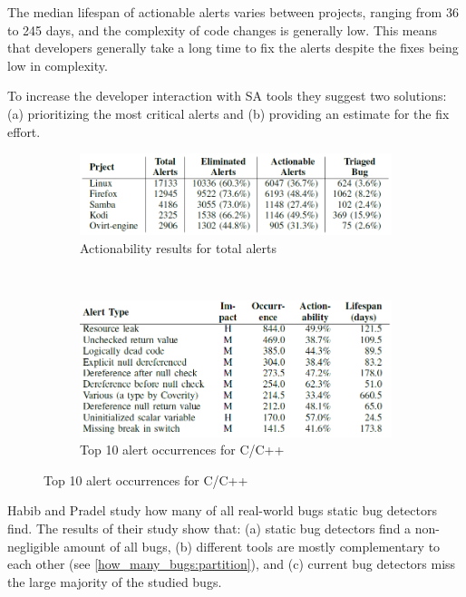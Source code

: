  The median lifespan of actionable alerts varies between projects, ranging from 36 to 245 days, and the complexity of code changes is generally low. This means that developers generally take a long time to fix the alerts despite the fixes being low in complexity.

 To increase the developer interaction with SA tools they suggest two solutions: (a) prioritizing the most critical alerts and (b) providing an estimate for the fix effort.

 \begin{figure}[H]
     \begin{subfigure}{1\textwidth}
         \centering
         \includegraphics[scale=0.4]{./src/how_use_sa_actionable.png}
         \caption{Actionability results for total alerts}\label{how_use_sa:actionable}
     \end{subfigure}\\
     \begin{subfigure}{1\textwidth}
         \centering
         \includegraphics[scale=0.4]{./src/how_use_sa_topalerts.png}
         \caption{Top 10 alert occurrences for C/C++}\label{how_use_sa:top}
     \end{subfigure}
 \end{figure}


 Habib and Pradel \cite{how_many_bugs} study how many of all real-world bugs static bug detectors find. The results of their study show that: (a) static bug detectors find a non-negligible amount of all bugs, (b) different tools are mostly complementary to each other (see \cref{how_many_bugs:partition}), and (c) current bug detectors miss the large majority of the studied bugs.

